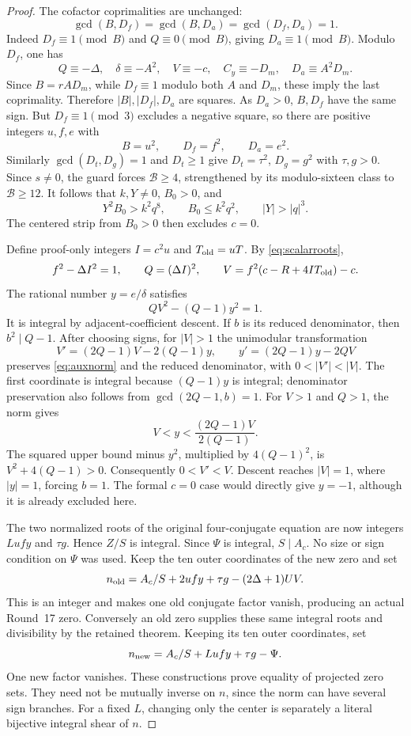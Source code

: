 \begin{proof}
The cofactor coprimalities are unchanged:
\[
 \gcd(B,D_f)=\gcd(B,D_a)=\gcd(D_f,D_a)=1.
\]
Indeed $D_f\equiv1\pmod B$ and $Q\equiv0\pmod B$, giving
$D_a\equiv1\pmod B$. Modulo $D_f$, one has
\[
 Q\equiv-\Delta,\quad\delta\equiv-A^2,\quad
 V\equiv-c,\quad C_y\equiv-D_m,\quad
 D_a\equiv A^2D_m.
\]
Since $B=rAD_m$, while $D_f\equiv1$ modulo both $A$ and $D_m$,
these imply the last coprimality. Therefore $|B|,|D_f|,D_a$ are squares.
As $D_a>0$, $B,D_f$ have the same sign. But $D_f\equiv1\pmod3$
excludes a negative square, so there are positive integers $u,f,e$ with
\begin{equation}\label{eq:scalarroots}
 B=u^2,\qquad D_f=f^2,\qquad D_a=e^2.
\end{equation}
Similarly $\gcd(D_t,D_g)=1$ and $D_t\ge1$ give
$D_t=\tau^2$, $D_g=g^2$ with $\tau,g>0$.
Since $s\ne0$, the guard forces $\mathcal B\ge4$, strengthened by its
modulo-sixteen class to $\mathcal B\ge12$.
It follows that $k,Y\ne0$, $B_0>0$, and
\[
 Y^2B_0>k^2q^8,\qquad B_0\le k^2q^2,
 \qquad |Y|>|q|^3.
\]
The centered strip from $B_0>0$ then excludes $c=0$.

Define proof-only integers $I=c^2u$ and $T_{\rm old}=uT$.
By \eqref{eq:scalarroots},
\[
 f^2-\Delta I^2=1,\qquad Q=(\Delta I)^2,\qquad
 V=f^2(c-R+4IT_{\rm old})-c.
\]
The rational number $y=e/\delta$ satisfies
\begin{equation}\label{eq:auxnorm}
 QV^2-(Q-1)y^2=1.
\end{equation}
It is integral by adjacent-coefficient descent. If $b$ is its reduced
denominator, then $b^2\mid Q-1$. After choosing signs, for $|V|>1$ the
unimodular transformation
\[
 V'=(2Q-1)V-2(Q-1)y,\qquad
 y'=(2Q-1)y-2QV
\]
preserves \eqref{eq:auxnorm} and the reduced denominator, with
$0<|V'|<|V|$. The first coordinate is integral because $(Q-1)y$ is
integral; denominator preservation also follows from
$\gcd(2Q-1,b)=1$. For $V>1$ and $Q>1$, the norm gives
\[
 V<y<\frac{(2Q-1)V}{2(Q-1)}.
\]
The squared upper bound minus $y^2$, multiplied by $4(Q-1)^2$,
is $V^2+4(Q-1)>0$. Consequently $0<V'<V$.
Descent reaches $|V|=1$, where $|y|=1$, forcing $b=1$.
The formal $c=0$ case would directly give $y=-1$, although it is already
excluded here.

The two normalized roots of the original four-conjugate equation are now
integers $Lufy$ and $\tau g$. Hence $Z/S$ is integral. Since $\Psi$
is integral, $S\mid A_c$. No size or sign condition on $\Psi$ was used.
Keep the ten outer coordinates of the new zero and set
\[
 n_{\rm old}=A_c/S+2ufy+\tau g-(2\Delta+1)UV.
\]
This is an integer and makes one old conjugate factor vanish, producing an
actual Round~17 zero. Conversely an old zero supplies these same integral
roots and divisibility by the retained theorem. Keeping its ten outer
coordinates, set
\[
 n_{\rm new}=A_c/S+Lufy+\tau g-\Psi.
\]
One new factor vanishes. These constructions prove equality of projected
zero sets. They need not be mutually inverse on $n$, since the norm can
have several sign branches. For a fixed $L$, changing only the center is
separately a literal bijective integral shear of $n$.
\end{proof}

